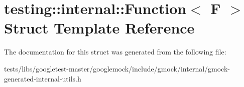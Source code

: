 \hypertarget{structtesting_1_1internal_1_1Function}{}\section{testing\+:\+:internal\+:\+:Function$<$ F $>$ Struct Template Reference}
\label{structtesting_1_1internal_1_1Function}


The documentation for this struct was generated from the following file\+:\begin{DoxyCompactItemize}
\item 
tests/libs/googletest-\/master/googlemock/include/gmock/internal/gmock-\/generated-\/internal-\/utils.\+h\end{DoxyCompactItemize}
